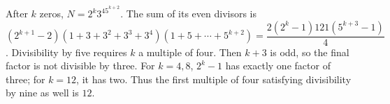 After $k$ zeros, $N=2^k3^45^{k+2}$. The sum of its even divisors is $(2^{k+1}-2)(1+3+3^2+3^3+3^4)(1+5+\cdots+5^{k+2})=\dfrac{2(2^k-1)121(5^{k+3}-1)}{4}$. Divisibility by five requires $k$ a multiple of four. Then $k+3$ is odd, so the final factor is not divisible by three. For $k=4,8$, $2^k-1$ has exactly one factor of three; for $k=12$, it has two. Thus the first multiple of four satisfying divisibility by nine as well is $\boxed{12}$.
